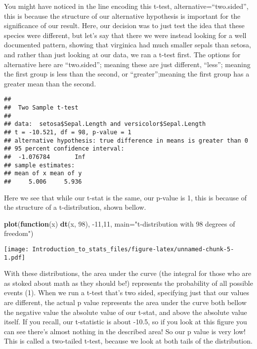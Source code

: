 \documentclass[
]{article}
\newenvironment{Shaded}{\begin{snugshade}}{\end{snugshade}}
\newcommand{\ControlFlowTok}[1]{\textcolor[rgb]{0.13,0.29,0.53}{\textbf{#1}}}
\newcommand{\DataTypeTok}[1]{\textcolor[rgb]{0.13,0.29,0.53}{#1}}
\newcommand{\DecValTok}[1]{\textcolor[rgb]{0.00,0.00,0.81}{#1}}
\newcommand{\KeywordTok}[1]{\textcolor[rgb]{0.13,0.29,0.53}{\textbf{#1}}}
\newcommand{\NormalTok}[1]{#1}
\newcommand{\OperatorTok}[1]{\textcolor[rgb]{0.81,0.36,0.00}{\textbf{#1}}}
\newcommand{\OtherTok}[1]{\textcolor[rgb]{0.56,0.35,0.01}{#1}}
\newcommand{\StringTok}[1]{\textcolor[rgb]{0.31,0.60,0.02}{#1}}
\begin{document}
You might have noticed in the line encoding this t-test,
alternative=``two.sided'', this is because the structure of our
alternative hypothesis is important for the significance of our result.
Here, our decision was to just test the idea that these species were
different, but let's say that there we were instead looking for a well
documented pattern, showing that virginica had much smaller sepals than
setosa, and rather than just looking at our data, we ran a t-test first.
The options for alternative here are ``two.sided''; meaning these are
just different, ``less''; meaning the first group is less than the
second, or ``greater'';meaning the first group has a greater mean than
the second.

\begin{Shaded}
\end{Shaded}

\begin{verbatim}
## 
##  Two Sample t-test
## 
## data:  setosa$Sepal.Length and versicolor$Sepal.Length
## t = -10.521, df = 98, p-value = 1
## alternative hypothesis: true difference in means is greater than 0
## 95 percent confidence interval:
##  -1.076784       Inf
## sample estimates:
## mean of x mean of y 
##     5.006     5.936
\end{verbatim}

Here we see that while our t-stat is the same, our p-value is 1, this is
because of the structure of a t-distribution, shown bellow.

\begin{Shaded}
\begin{Highlighting}[]
\KeywordTok{plot}\NormalTok{(}\ControlFlowTok{function}\NormalTok{(x) }\KeywordTok{dt}\NormalTok{(x, }\DecValTok{98}\NormalTok{), }\DecValTok{{-}11}\NormalTok{,}\DecValTok{11}\NormalTok{, }\DataTypeTok{main=}\StringTok{"t{-}distribution with 98 degrees of freedom"}\NormalTok{)}
\end{Highlighting}
\end{Shaded}

\texttt{[image: Introduction\_to\_stats\_files/figure-latex/unnamed-chunk-5-1.pdf]}

With these distributions, the area under the curve (the integral for
those who are as stoked about math as they should be!) represents the
probability of all possible events (1). When we run a t-test that's two
sided, specifying just that our values are different, the actual p value
represents the area under the curve both bellow the negative value the
absolute value of our t-stat, and above the absolute value itself. If
you recall, our t-statistic is about -10.5, so if you look at this
figure you can see there's almost nothing in the described area! So our
p value is very low! This is called a two-tailed t-test, because we look
at both tails of the distribution.
\end{document}
